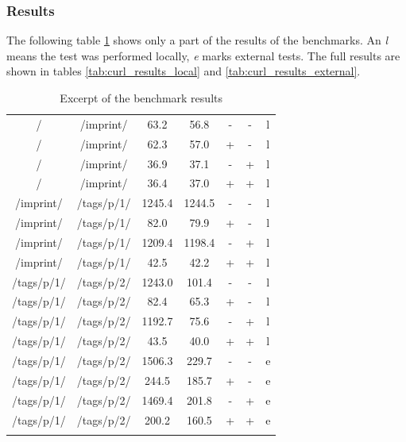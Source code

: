 \subsubsection{Results}

The following table \ref{tab:short_curl} shows only a part of the results of the \curl{} benchmarks.
An \emph{l} means the test was performed locally, \emph{e} marks external tests.
The full results are shown in tables \ref{tab:curl_results_local} and \ref{tab:curl_results_external}.

\begin{center}
\begin{longtable}{ccccccc}
    \caption{Excerpt of the \curl{} benchmark results}
    \\
	\hline
	\thead{From} & \thead{To} & \thead{Common} & \thead{\lare{}} & \thead{DC} & \thead{TC} & \thead{} \\
	\hline
/ & /imprint/ & 63.2 & 56.8 & - & - & l \\
/ & /imprint/ & 62.3 & 57.0 & + & - & l \\
/ & /imprint/ & 36.9 & 37.1 & - & + & l \\
/ & /imprint/ & 36.4 & 37.0 & + & + & l \\
	\hline
	\hline
/imprint/ & /tags/p/1/ & 1245.4 & 1244.5 & - & - & l \\
/imprint/ & /tags/p/1/ & 82.0 & 79.9 & + & - & l \\
/imprint/ & /tags/p/1/ & 1209.4 & 1198.4 & - & + & l \\
/imprint/ & /tags/p/1/ & 42.5 & 42.2 & + & + & l \\
\hline
\hline
/tags/p/1/ & /tags/p/2/ & 1243.0 & 101.4 & - & - & l \\
/tags/p/1/ & /tags/p/2/ & 82.4 & 65.3 & + & - & l \\
/tags/p/1/ & /tags/p/2/ & 1192.7 & 75.6 & - & + & l \\
/tags/p/1/ & /tags/p/2/ & 43.5 & 40.0 & + & + & l \\
\hline
\hline
/tags/p/1/ & /tags/p/2/ & 1506.3 & 229.7 & - & - & e \\
/tags/p/1/ & /tags/p/2/ & 244.5 & 185.7 & + & - & e \\
/tags/p/1/ & /tags/p/2/ & 1469.4 & 201.8 & - & + & e \\
/tags/p/1/ & /tags/p/2/ & 200.2 & 160.5 & + & + & e \\
\hline
\label{tab:short_curl}
\end{longtable}
\end{center}

